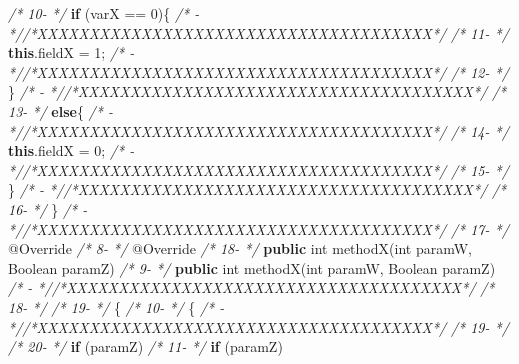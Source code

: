 \documentclass[
]{article}
\newenvironment{Shaded}{\begin{snugshade}}{\end{snugshade}}
\newcommand{\AttributeTok}[1]{\textcolor[rgb]{0.77,0.63,0.00}{#1}}
\newcommand{\BuiltInTok}[1]{#1}
\newcommand{\CommentTok}[1]{\textcolor[rgb]{0.56,0.35,0.01}{\textit{#1}}}
\newcommand{\DataTypeTok}[1]{\textcolor[rgb]{0.13,0.29,0.53}{#1}}
\newcommand{\DecValTok}[1]{\textcolor[rgb]{0.00,0.00,0.81}{#1}}
\newcommand{\FunctionTok}[1]{\textcolor[rgb]{0.00,0.00,0.00}{#1}}
\newcommand{\KeywordTok}[1]{\textcolor[rgb]{0.13,0.29,0.53}{\textbf{#1}}}
\newcommand{\NormalTok}[1]{#1}
\begin{document}
\begin{landscape}
\begin{Shaded}
\begin{Highlighting}[]
\CommentTok{/* 10-   */}        \KeywordTok{if}\NormalTok{ (varX == }\DecValTok{0}\NormalTok{)\{                                  }\CommentTok{/*   -   *//*XXXXXXXXXXXXXXXXXXXXXXXXXXXXXXXXXXXXXX*/}               
\CommentTok{/* 11-   */}            \KeywordTok{this}\NormalTok{.}\FunctionTok{fieldX}\NormalTok{ = }\DecValTok{1}\NormalTok{;                             }\CommentTok{/*   -   *//*XXXXXXXXXXXXXXXXXXXXXXXXXXXXXXXXXXXXXX*/}               
\CommentTok{/* 12-   */}\NormalTok{        \}                                                }\CommentTok{/*   -   *//*XXXXXXXXXXXXXXXXXXXXXXXXXXXXXXXXXXXXXX*/}               
\CommentTok{/* 13-   */}        \KeywordTok{else}\NormalTok{\{                                            }\CommentTok{/*   -   *//*XXXXXXXXXXXXXXXXXXXXXXXXXXXXXXXXXXXXXX*/}               
\CommentTok{/* 14-   */}            \KeywordTok{this}\NormalTok{.}\FunctionTok{fieldX}\NormalTok{ = }\DecValTok{0}\NormalTok{;                             }\CommentTok{/*   -   *//*XXXXXXXXXXXXXXXXXXXXXXXXXXXXXXXXXXXXXX*/}               
\CommentTok{/* 15-   */}\NormalTok{        \}                                                }\CommentTok{/*   -   *//*XXXXXXXXXXXXXXXXXXXXXXXXXXXXXXXXXXXXXX*/}               
\CommentTok{/* 16-   */}\NormalTok{    \}                                                    }\CommentTok{/*   -   *//*XXXXXXXXXXXXXXXXXXXXXXXXXXXXXXXXXXXXXX*/}               
\CommentTok{/* 17-   */}    \AttributeTok{@Override}                                            \CommentTok{/*  8-   */}    \AttributeTok{@Override}                                            
\CommentTok{/* 18-   */}    \KeywordTok{public} \DataTypeTok{int} \FunctionTok{methodX}\NormalTok{(}\DataTypeTok{int}\NormalTok{ paramW, }\BuiltInTok{Boolean}\NormalTok{ paramZ)       }\CommentTok{/*  9-   */}    \KeywordTok{public} \DataTypeTok{int} \FunctionTok{methodX}\NormalTok{(}\DataTypeTok{int}\NormalTok{ paramW, }\BuiltInTok{Boolean}\NormalTok{ paramZ)       }
\CommentTok{/*   -   *//*XXXXXXXXXXXXXXXXXXXXXXXXXXXXXXXXXXXXXX*/}               \CommentTok{/* 18-   */}                                                         
\CommentTok{/* 19-   */}\NormalTok{    \{                                                    }\CommentTok{/* 10-   */}\NormalTok{    \{                                                    }
\CommentTok{/*   -   *//*XXXXXXXXXXXXXXXXXXXXXXXXXXXXXXXXXXXXXX*/}               \CommentTok{/* 19-   */}                                                         
\CommentTok{/* 20-   */}        \KeywordTok{if}\NormalTok{ (paramZ)                                      }\CommentTok{/* 11-   */}        \KeywordTok{if}\NormalTok{ (paramZ)                                      }

\end{Highlighting}
\end{Shaded}
\end{landscape}
\end{document}
